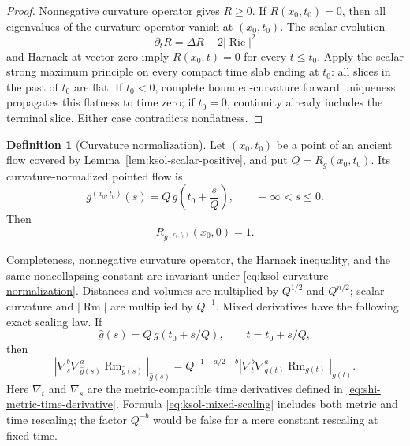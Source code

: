 \documentclass[10pt]{coll-l}
\theoremstyle{definition}
\newtheorem{definition}[theorem]{Definition}
\theoremstyle{remark}
\numberwithin{section}{chapter}
\numberwithin{equation}{chapter}
\newcommand{\Ric}{\operatorname{Ric}}
\newcommand{\Rm}{\operatorname{Rm}}
\begin{document}
\begin{proof}
Nonnegative curvature operator gives $R\geq0$.  If $R(x_0,t_0)=0$, then all
eigenvalues of the curvature operator vanish at $(x_0,t_0)$.  The scalar
evolution
\begin{equation}
                  \partial_tR=\Delta R+2|\Ric|^2              \label{eq:ksol-scalar-evolution}
\end{equation}
and Harnack at vector zero imply $R(x_0,t)=0$ for every $t\leq t_0$.
Apply the scalar strong maximum principle on every compact time slab ending
at $t_0$: all slices in the past of $t_0$ are flat.  If $t_0<0$, complete
bounded-curvature forward uniqueness propagates this flatness to time zero;
if $t_0=0$, continuity already includes the terminal slice.  Either case
contradicts nonflatness.
\end{proof}

\begin{definition}[Curvature normalization]
\label{def:ksol-curvature-normalization}
Let $(x_0,t_0)$ be a point of an ancient flow covered by
Lemma~\ref{lem:ksol-scalar-positive}, and put $Q=R_g(x_0,t_0)$.  Its
curvature-normalized pointed flow is
\begin{equation}
 g^{(x_0,t_0)}(s)=Q\,g\!\left(t_0+\frac{s}{Q}\right),
 \qquad -\infty<s\leq0.                              \label{eq:ksol-curvature-normalization}
\end{equation}
Then
\begin{equation}
                  R_{g^{(x_0,t_0)}}(x_0,0)=1.         \label{eq:ksol-normalized-base-curvature}
\end{equation}
\end{definition}

Completeness, nonnegative curvature operator, the Harnack inequality, and
the same noncollapsing constant are invariant under
\eqref{eq:ksol-curvature-normalization}.  Distances and volumes are
multiplied by $Q^{1/2}$ and $Q^{n/2}$; scalar curvature and $|\Rm|$ are
multiplied by $Q^{-1}$.  Mixed derivatives have the following exact
scaling law.  If
\[
       \widehat g(s)=Q\,g(t_0+s/Q),\qquad t=t_0+s/Q,
\]
then
\begin{equation}
 \left|\nabla_s^b\nabla_{\widehat g(s)}^a
            \Rm_{\widehat g(s)}\right|_{\widehat g(s)}
 =Q^{-1-a/2-b}
   \left|\nabla_t^b\nabla_{g(t)}^a
            \Rm_{g(t)}\right|_{g(t)}.                \label{eq:ksol-mixed-scaling}
\end{equation}
Here $\nabla_t$ and $\nabla_s$ are the metric-compatible time derivatives
defined in \eqref{eq:shi-metric-time-derivative}.  Formula
\eqref{eq:ksol-mixed-scaling} includes both metric and time rescaling; the
factor $Q^{-b}$ would be false for a mere constant rescaling at fixed time.
\end{document}
